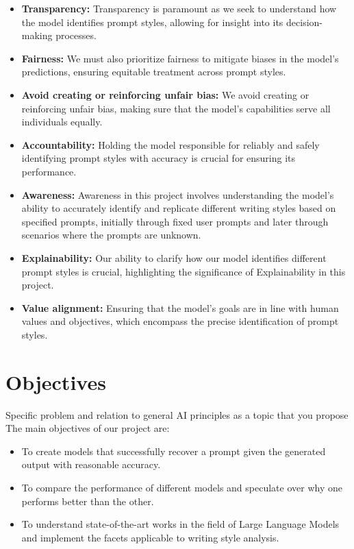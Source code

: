 \documentclass{article}
\begin{document}
\begin{itemize}
    \item \textbf{Transparency:} Transparency is paramount as we seek to understand how the model identifies prompt styles, allowing for insight into its decision-making processes. 
    \item \textbf{Fairness:} We must also prioritize fairness to mitigate biases in the model's predictions, ensuring equitable treatment across prompt styles.
    \item \textbf{Avoid creating or reinforcing unfair bias:} We avoid creating or reinforcing unfair bias, making sure that the model's capabilities serve all individuals equally.
    \item \textbf{Accountability:} Holding the model responsible for reliably and safely identifying prompt styles with accuracy is crucial for ensuring its performance.
    \item \textbf{Awareness:} Awareness in this project involves understanding the model's ability to accurately identify and replicate different writing styles based on specified prompts, initially through fixed user prompts and later through scenarios where the prompts are unknown.
    \item \textbf{Explainability:} Our ability to clarify how our model identifies different prompt styles is crucial, highlighting the significance of Explainability in this project.
    \item \textbf{Value alignment:} Ensuring that the model's goals are in line with human values and objectives, which encompass the precise identification of prompt styles.


\end{itemize}





\section{Objectives}
Specific problem and relation to general AI principles as a topic that you propose\\
The main objectives of our project are:
\begin{itemize}
    \item To create models that successfully recover a prompt given the generated output with reasonable accuracy.
    \item To compare the performance of different models and speculate over why one performs better than the other.
    \item To understand state-of-the-art works in the field of Large Language Models and implement the facets applicable to writing style analysis.
\end{itemize}
\end{document}
